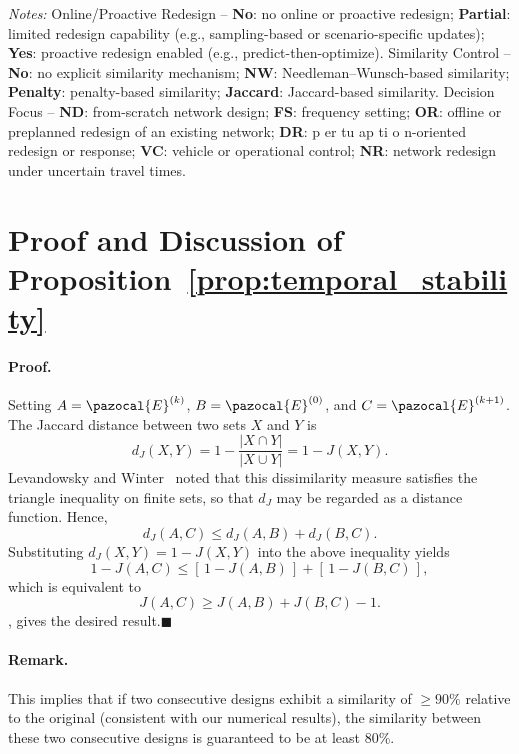 \documentclass[a4paper,fleqn]{cas-sc}
\begin{document}
\begin{table}[htbp]
\begin{threeparttable}
\vspace{2pt}
\parbox{\textwidth}{\footnotesize
\textit{Notes:} Online/Proactive Redesign -- \textbf{No}: no online or proactive redesign; \textbf{Partial}: limited redesign capability (e.g., sampling-based or scenario-specific updates); \textbf{Yes}: proactive redesign enabled (e.g., predict-then-optimize). 
Similarity Control -- \textbf{No}: no explicit similarity mechanism; \textbf{NW}: Needleman--Wunsch-based similarity; \textbf{Penalty}: penalty-based similarity; \textbf{Jaccard}: Jaccard-based similarity. 
Decision Focus -- \textbf{ND}: from-scratch network design; \textbf{FS}: frequency setting; \textbf{OR}: offline or preplanned redesign of an existing network; \textbf{DR}: p er tu ap ti o n-oriented redesign or response; \textbf{VC}: vehicle or operational control; \textbf{NR}: network redesign under uncertain travel times.
}

\caption{Comparative analysis of public transport optimization approaches across decision scope, online/proactive redesign capability, and similarity control mechanisms.}
\label{tab:innovation_matrix}
\end{threeparttable}
\end{table}

\section{Proof and Discussion of Proposition~\ref{prop:temporal_stability}}
\label{app:temporal_stability_proof}

\paragraph{Proof.}
Setting $A=\pazocal{E}^{(k)}$, $B=\pazocal{E}^{(0)}$, and $C=\pazocal{E}^{(k+1)}$.
The Jaccard distance between two sets $X$ and $Y$ is
\[
d_J(X,Y)=1-\frac{|X\cap Y|}{|X\cup Y|}=1-J(X,Y).
\]
Levandowsky and Winter~\citep{levandowsky1971distance} noted that this
dissimilarity measure satisfies the triangle inequality on finite sets,
so that $d_J$ may be regarded as a distance function. Hence,
\[
d_J(A,C)\le d_J(A,B)+d_J(B,C).
\]
Substituting $d_J(X,Y)=1-J(X,Y)$ into the above inequality yields
\[
1-J(A,C)
\le [\,1-J(A,B)\,]+[\,1-J(B,C)\,],
\]
which is equivalent to
\[
J(A,C)\ge J(A,B)+J(B,C)-1.
\]
, gives the desired result.\hfill$\blacksquare$

\paragraph{Remark.}
This implies that if two consecutive designs exhibit a similarity of $\geq 90\%$ relative to the original (consistent with our numerical results), the similarity between these two consecutive designs is guaranteed to be at least 80\%.
\end{document}
